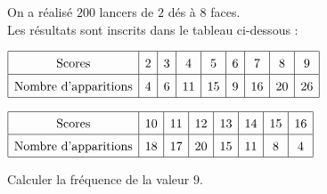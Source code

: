 \begin{exercice*}[Dés]
    On a réalisé $200$ lancers de $2$ dés à $8$ faces.\\
    Les résultats sont inscrits dans le tableau ci-dessous :
    
    \medskip
    \hspace*{-5mm}
    $\def\arraystretch{1.5}\begin{array}{|c|c|c|c|c|c|c|c|c|c}
        \hline  \text{Scores}&2&3&4&5&6&7&8&9\\\hline
        \text{Nombre d'apparitions}&4&6&11&15&9&16&20&26\\\hline
    \end{array}$
    
    \medskip
    \hspace*{-5mm}
    $\def\arraystretch{1.5}\begin{array}{|c|c|c|c|c|c|c|c|c}\hline  \text{Scores}&10&11&12&13&14&15&16\\
    \hline \text{Nombre d'apparitions}&18&17&20&15&11&8&4\\
    \hline\end{array}$
    
    \medskip
     Calculer la fréquence de la valeur $9$.

\end{exercice*}
